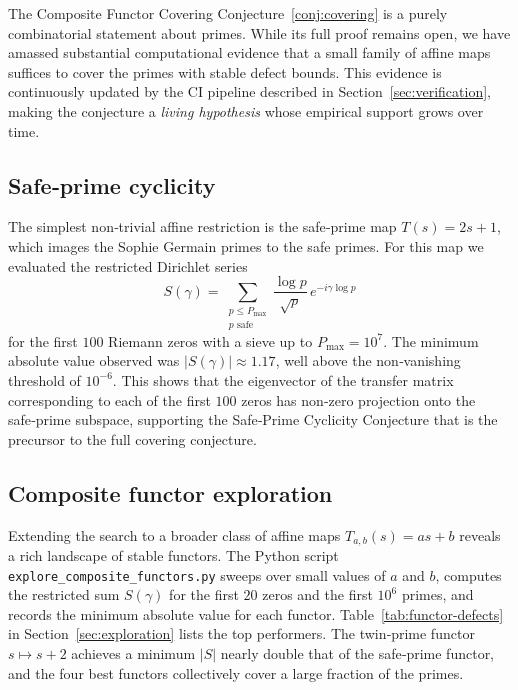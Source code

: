 \documentclass[11pt,reqno]{amsart}
\theoremstyle{definition}
\theoremstyle{remark}
\begin{document}
The Composite Functor Covering Conjecture~\ref{conj:covering} is a purely combinatorial statement about primes.  While its full proof remains open, we have amassed substantial computational evidence that a small family of affine maps suffices to cover the primes with stable defect bounds.  This evidence is continuously updated by the CI pipeline described in Section~\ref{sec:verification}, making the conjecture a \emph{living hypothesis} whose empirical support grows over time.

\subsection{Safe‑prime cyclicity}
\label{sec:safe-prime-evidence}

The simplest non‑trivial affine restriction is the safe‑prime map \(T(s)=2s+1\), which images the Sophie Germain primes to the safe primes.  For this map we evaluated the restricted Dirichlet series
\[
S(\gamma) = \sum_{\substack{p\le P_{\max}\\ p\text{ safe}}} \frac{\log p}{\sqrt{p}}\, e^{-i\gamma\log p}
\]
for the first \(100\) Riemann zeros with a sieve up to \(P_{\max}=10^7\).  The minimum absolute value observed was \(|S(\gamma)| \approx 1.17\), well above the non‑vanishing threshold of \(10^{-6}\).  This shows that the eigenvector of the transfer matrix corresponding to each of the first \(100\) zeros has non‑zero projection onto the safe‑prime subspace, supporting the Safe‑Prime Cyclicity Conjecture that is the precursor to the full covering conjecture.

\subsection{Composite functor exploration}
\label{sec:composite-evidence}

Extending the search to a broader class of affine maps \(T_{a,b}(s)=as+b\) reveals a rich landscape of stable functors.  The Python script \texttt{explore\_composite\_functors.py} sweeps over small values of \(a\) and \(b\), computes the restricted sum \(S(\gamma)\) for the first \(20\) zeros and the first \(10^6\) primes, and records the minimum absolute value for each functor.  Table~\ref{tab:functor-defects} in Section~\ref{sec:exploration} lists the top performers.  The twin‑prime functor \(s\mapsto s+2\) achieves a minimum \(|S|\) nearly double that of the safe‑prime functor, and the four best functors collectively cover a large fraction of the primes.
\end{document}
